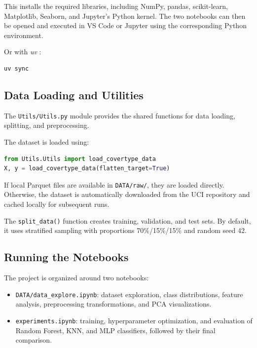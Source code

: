 \documentclass[10pt,a4paper]{article}
\begin{document}
This installs the required libraries, including NumPy, pandas,
scikit-learn, Matplotlib, Seaborn, and Jupyter's Python kernel.
The two notebooks can then be opened and executed in VS Code
or Jupyter using the corresponding Python environment.

Or with \textit{uv} :
\begin{lstlisting}[language=bash]
uv sync
\end{lstlisting}

\subsection*{Data Loading and Utilities}

The \texttt{Utils/Utils.py} module provides the shared functions
for data loading, splitting, and preprocessing.

The dataset is loaded using:

\begin{lstlisting}[language=Python]
from Utils.Utils import load_covertype_data
X, y = load_covertype_data(flatten_target=True)
\end{lstlisting}

If local Parquet files are available in \texttt{DATA/raw/},
they are loaded directly. Otherwise, the dataset is
automatically downloaded from the UCI repository and cached
locally for subsequent runs.

The \texttt{split\_data()} function creates training, validation,
and test sets. By default, it uses stratified sampling with
proportions 70\%/15\%/15\% and random seed 42.

\subsection*{Running the Notebooks}

The project is organized around two notebooks:

\begin{itemize}
    \item \texttt{DATA/data\_explore.ipynb}: dataset exploration,
    class distributions, feature analysis, preprocessing
    transformations, and PCA visualizations.

    \item \texttt{experiments.ipynb}: training, hyperparameter
    optimization, and evaluation of Random Forest, KNN,
    and MLP classifiers, followed by their final comparison.
\end{itemize}
\end{document}
